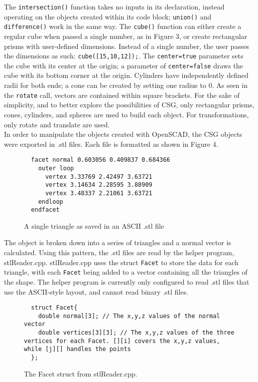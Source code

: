 \documentclass[12pt]{article}
\begin{document}
\begin{doublespace}
The \texttt{intersection()} function takes no inputs in its declaration, instead operating on the objects created within its code block; \texttt{union()} and \texttt{difference()} work in the same way. The \texttt{cube()} function can either create a regular cube when passed a single number, as in Figure 3, or create rectangular prisms with user-defined dimensions. Instead of a single number, the user  passes the dimensions as such: \texttt{cube([15,10,12]);}. The \texttt{center=true} parameter sets the cube with its center at the origin; a parameter of \texttt{center=false} draws the cube with its bottom corner at the origin. Cylinders have independently defined radii for both ends; a cone can be created by setting one radius to 0. As seen in the \texttt{rotate} call, vectors are contained within square brackets. For the sake of simplicity, and to better explore the possibilities of CSG, only rectangular prisms, cones, cylinders, and spheres are used to build each object. For transformations, only rotate and translate are used.\\

In order to manipulate the objects created with OpenSCAD, the CSG objects were exported in .stl files. Each file is formatted as shown in Figure 4.\\
\begin{figure}[h]
\begin{lstlisting}
  facet normal 0.603056 0.409837 0.684366
    outer loop
      vertex 3.33769 2.42497 3.63721
      vertex 3.14634 2.28595 3.88909
      vertex 3.48337 2.21061 3.63721
    endloop
  endfacet
\end{lstlisting}
\centering
\caption{A single triangle as saved in an ASCII .stl file}
\end{figure}

The object is broken down into a series of triangles and a normal vector is calculated. Using this pattern, the .stl files are read by the helper program, stlReader.cpp. stlReader.cpp uses the struct \texttt{Facet} to store the data for each triangle, with each \texttt{Facet} being added to a vector containing all the triangles of the shape. The helper program is currently only configured to read .stl files that use the ASCII-style layout, and cannot read binary .stl files.\\
\lstset{language=C++}
\begin{figure}[h]
  \begin{lstlisting}
  struct Facet{
    double normal[3]; // The x,y,z values of the normal vector
    double vertices[3][3]; // The x,y,z values of the three vertices for each Facet. [][i] covers the x,y,z values, while [j][] handles the points
  };
\end{lstlisting}
\centering
\caption{The Facet struct from stlReader.cpp.}
\end{figure}


\end{doublespace}
\end{document}
